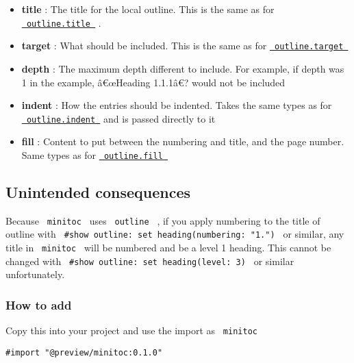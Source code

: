 \begin{itemize}
\tightlist
\item
  \textbf{title} : The title for the local outline. This is the same as
  for
  \href{https://typst.app/docs/reference/meta/outline/\#parameters-title}{\texttt{\ outline.title\ }}
  .
\item
  \textbf{target} : What should be included. This is the same as for
  \href{https://typst.app/docs/reference/meta/outline/\#parameters-target}{\texttt{\ outline.target\ }}
\item
  \textbf{depth} : The maximum depth different to include. For example,
  if depth was 1 in the example, â€œHeading 1.1.1â€? would not be
  included
\item
  \textbf{indent} : How the entries should be indented. Takes the same
  types as for
  \href{https://typst.app/docs/reference/meta/outline/\#parameters-indent}{\texttt{\ outline.indent\ }}
  and is passed directly to it
\item
  \textbf{fill} : Content to put between the numbering and title, and
  the page number. Same types as for
  \href{https://typst.app/docs/reference/meta/outline/\#parameters-fill}{\texttt{\ outline.fill\ }}
\end{itemize}

\subsection{Unintended consequences}\label{unintended-consequences}

Because \texttt{\ minitoc\ } uses \texttt{\ outline\ } , if you apply
numbering to the title of outline with
\texttt{\ \#show\ outline:\ set\ heading(numbering:\ "1.")\ } or
similar, any title in \texttt{\ minitoc\ } will be numbered and be a
level 1 heading. This cannot be changed with
\texttt{\ \#show\ outline:\ set\ heading(level:\ 3)\ } or similar
unfortunately.

\subsubsection{How to add}\label{how-to-add}

Copy this into your project and use the import as \texttt{\ minitoc\ }

\begin{verbatim}
#import "@preview/minitoc:0.1.0"
\end{verbatim}



